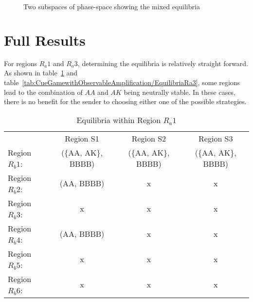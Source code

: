 \documentclass[a4paper,12pt]{article}
\numberwithin{equation}{section}
\begin{document}
\begin{figure}[h]
\begin{center}
\captionsetup[subfigure]{width=40mm}
\hspace{16mm}
\caption{Two subspaces of phase-space showing the mixed equilibria}
\label{fig:Figure 67}
\end{center}
\end{figure}

\newpage


\section{Full Results}
\label{sec:Full Results}

 For regions $R_{a}1$ and $R_{a}3$, determining the equilibria is relatively straight forward. As shown in table~\ref{tab:CueGamewithObservableAmplification/EquilibriaRa1} and table~\ref{tab:CueGamewithObservableAmplification/EquilibriaRa3}, some regions lead to the combination of $AA$ and $AK$ being neutrally stable. In these cases, there is no benefit for the sender to choosing either one of the possible strategies.


\begin{table}[h]
\begin{center}
\begin{tabular}{lccc}
 & Region S1 & Region S2 & Region S3\\
Region $R_{b}1$: & (\{AA, AK\}, BBBB) & (\{AA, AK\}, BBBB) & (\{AA, AK\}, BBBB)\\
Region $R_{b}2$: & (AA, BBBB) & x & x\\
Region $R_{b}3$: & x & x & x\\
Region $R_{b}4$: & (AA, BBBB) & x & x\\
Region $R_{b}5$: & x & x & x\\
Region $R_{b}6$: & x & x & x
\end{tabular}
\end{center}
\caption{Equilibria within Region $R_{a}1$}
\label{tab:CueGamewithObservableAmplification/EquilibriaRa1}
\end{table}
\end{document}
